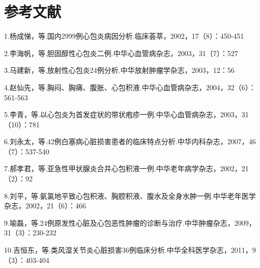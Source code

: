 \protect\hypertarget{text00147.html}{}{}

\section{参考文献}

1.杨成悌，等.国内2999例心包炎病因分析.临床荟萃，2002，17（8）：450-451

2.李海帆，等.胆固醇性心包炎二例.中华心血管病杂志，2003，31（7）：527

3.马建新，等.放射性心包炎24例分析.中华放射肿瘤学杂志，2003，12：56

4.赵仙先，等.胸闷、胸痛、腹胀、心包积液.中华心血管病杂志，2004，32（6）：561-563

5.李青，等.以心包炎为首发症状的带状疱疹一例.中华心血管病杂志，2003，31（10）：781

6.刘永太，等.42例白塞病心脏损害患者的临床特点分析.中华内科杂志，2007，46（7）：537-540

7.郝孝君，等.亚急性甲状腺炎合并心包积液一例.中华老年病学杂志，2002，21（2）：92

8.刘平，等.氨氯地平致心包积液、胸腔积液、腹水及全身水肿一例.中华老年医学杂志，2002，21（6）：466

9.喻磊，等.24例原发性心脏及心包恶性肿瘤的诊断与治疗.中华肿瘤杂志，2009，31（3）：230-232

10.吉恒东，等.类风湿关节炎心脏损害36例临床分析.中华全科医学杂志，2011，9（3）：403-404

\protect\hypertarget{text00148.html}{}{}

